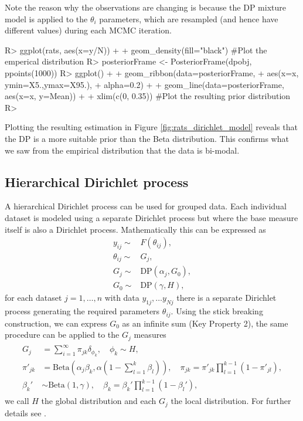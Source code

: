 \documentclass[nojss]{jss}
\begin{document}
Note the reason why the observations are changing is because the DP mixture model is applied to the $\theta_i$ parameters, which are resampled (and hence have different values) during each MCMC iteration.

\begin{Schunk}
\begin{Sinput}
R> ggplot(rats, aes(x=y/N)) +
+    geom_density(fill="black") #Plot the emperical distribution
R> posteriorFrame <- PosteriorFrame(dpobj, ppoints(1000))
R> ggplot() +
+    geom_ribbon(data=posteriorFrame,
+                aes(x=x, ymin=X5.,ymax=X95.),
+                alpha=0.2) +
+    geom_line(data=posteriorFrame, aes(x=x, y=Mean)) +
+    xlim(c(0, 0.35)) #Plot the resulting prior distribution
R> 
\end{Sinput}
\end{Schunk}

Plotting the resulting estimation in Figure \ref{fig:rats_dirichlet_model} reveals that the DP is a more suitable prior than the Beta distribution. This confirms what we saw from the empirical distribution that the data is bi-modal.

\subsection{Hierarchical Dirichlet process}
A hierarchical Dirichlet process \cite{teh_sharing_2005} can be used for grouped data. Each individual dataset is modeled using a separate Dirichlet process but where the base measure itself is also a Dirichlet process. Mathematically this can be expressed as
\begin{align*}
y_{ij}  \sim & F(\theta _{ij}), \\
\theta _{ij} \sim & G_j, \\
G_j \sim & \text{DP} (\alpha _j, G_0 ), \\
G_0 \sim & \text{DP} (\gamma, H),
\end{align*}
for each dataset $j=1, \dots,n$ with data $y_{1j}, \ldots y_{Nj}$ there is a separate Dirichlet process generating the required parameters $\theta _{ij}$. Using the stick breaking construction, we can express $G_0$ as an infinite sum (Key Property 2), the same procedure can be applied to the $G_j$ measures
\begin{align}
\begin{split}
G_j & = \sum _{i=1} ^\infty \pi _{jk} \delta _{\phi _k}, \quad \phi _k  \sim H, \\
\pi ' _{jk} & = \text{Beta}  \left( \alpha _j \beta _k , \alpha \left( 1 - \sum _{l=1} ^k \beta _l \right) \right), \quad
\pi _{jk}  = \pi ' _{jk} \prod _{l=1} ^{k-1} ( 1- \pi ' _{jl} ), \\
\beta _k ' &  \sim  \text{Beta} \left(1, \gamma \right), \quad
\beta _k  = \beta _k ' \prod_ {l=1} ^{k-1} (1 - \beta _l '),
\end{split}
\label{eq:hierbase}
\end{align}
we call $H$ the global distribution and each $G_j$ the local distribution. For further details see \cite{teh_sharing_2005}.
\end{document}
